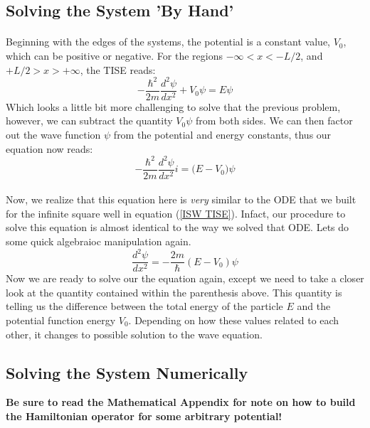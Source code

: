 \documentclass[12pt,letterpaper]{book}
\begin{document}

\subsection*{Solving the System 'By Hand'}
\paragraph*{}Beginning with the edges of the systems, the potential is a constant value, $V_0$, which can be positive or negative. For the regions 
$-\infty < x < -L/2$, and $+L/2 > x > +\infty$, the TISE reads:
\begin{equation}
\label{FSW edge}
-\frac{\hbar^2}{2m}\frac{d^2\psi}{dx^2} + V_0\psi = E\psi
\end{equation}
Which looks a little bit more challenging to solve that the previous problem, however, we can subtract the quantity $V_0\psi$ from both sides. We can then factor out the wave function $\psi$ from the potential and energy constants, thus our equation now reads:
\begin{equation}
-\frac{\hbar^2}{2m}\frac{d^2\psi}{dx^2} i = \Big(E - V_0\Big)\psi
\end{equation}
\paragraph*{}Now, we realize that this equation here is \textit{very} similar to the ODE that we built for the infinite square well in equation (\ref{ISW TISE}). Infact, our procedure to solve this equation is almost identical to the way we solved that ODE. Lets do some quick algebraioc manipulation again.
\begin{equation}
\frac{d^2\psi}{dx^2} = -\frac{2m}{\hbar}(E - V_0)\psi
\end{equation}
Now we are ready to solve our the equation again, except we need to take a closer look at the quantity contained within the parenthesis above. This quantity is telling us the difference between the total energy of the particle $E$ and the potential function energy $V_0$. Depending on how these values related to each other, it changes to possible solution to the wave equation.


\subsection*{Solving the System Numerically}
\textbf{Be sure to read the Mathematical Appendix for note on how to build the Hamiltonian operator for some arbitrary potential!}
\end{document}
